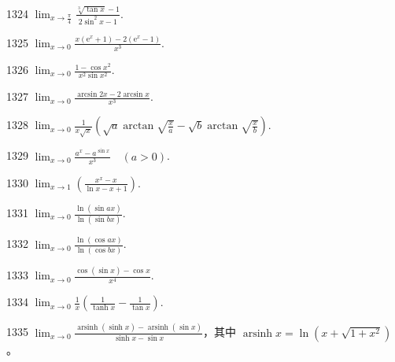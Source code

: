\begin{prob}[S]{1324}
$\lim_{x \to \frac{\pi}{4}} \frac{\sqrt[3]{\tan x} - 1}{2\sin^2 x - 1}$.
\end{prob}

\begin{prob}[S]{1325}
$\lim_{x \to 0} \frac{x(\mathrm{e}^x + 1) - 2(\mathrm{e}^x - 1)}{x^3}$.
\end{prob}

\begin{prob}[S]{1326}
$\lim_{x \to 0} \frac{1 - \cos x^2}{x^2 \sin x^2}$.
\end{prob}

\begin{prob}[S]{1327}
$\lim_{x \to 0} \frac{\arcsin 2x - 2\arcsin x}{x^3}$.
\end{prob}

\begin{prob}[S]{1328}
$\lim_{x \to 0} \frac{1}{x\sqrt{x}} \left( \sqrt{a}\arctan\sqrt{\frac{x}{a}} - \sqrt{b}\arctan\sqrt{\frac{x}{b}} \right)$.
\end{prob}

\begin{prob}[S]{1329}
$\lim_{x \to 0} \frac{a^x - a^{\sin x}}{x^3} \quad (a > 0)$.
\end{prob}

\begin{prob}[S]{1330}
$\lim_{x \to 1} \left( \frac{x^x - x}{\ln x - x + 1} \right)$.
\end{prob}

\begin{prob}[S]{1331}
$\lim_{x \to 0} \frac{\ln(\sin ax)}{\ln(\sin bx)}$.
\end{prob}

\begin{prob}[S]{1332}
$\lim_{x \to 0} \frac{\ln(\cos ax)}{\ln(\cos bx)}$.
\end{prob}

\begin{prob}[S]{1333}
$\lim_{x \to 0} \frac{\cos(\sin x) - \cos x}{x^4}$.
\end{prob}

\begin{prob}[S]{1334}
$\lim_{x \to 0} \frac{1}{x} \left( \frac{1}{\tanh x} - \frac{1}{\tan x} \right)$.
\end{prob}

\begin{prob}[S]{1335}
$\lim_{x \to 0} \frac{\operatorname{arsinh}(\sinh x) - \operatorname{arsinh}(\sin x)}{\sinh x - \sin x}$，其中 $\operatorname{arsinh} x = \ln(x + \sqrt{1 + x^2})$。
\end{prob}

